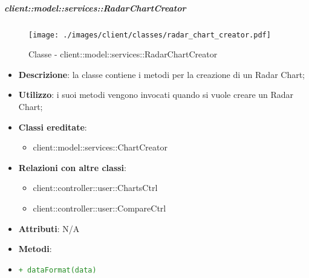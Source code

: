 		\subparagraph{client::model::services::RadarChartCreator} %
		\label{subp:radarchartcreator}
			\begin{figure}[htbp]
				\centering
				\centerline{\texttt{[image: ./images/client/classes/radar\_chart\_creator.pdf]}}
				\caption{Classe - client::model::services::RadarChartCreator}
			\end{figure}
			\begin{itemize}
				\item \textbf{Descrizione}: la classe contiene i metodi per la creazione di un Radar Chart;
				\item \textbf{Utilizzo}: i suoi metodi vengono invocati quando si vuole creare un Radar Chart;
				\item \textbf{Classi ereditate}:
					\begin{itemize}
						\item client::model::services::ChartCreator
					\end{itemize}
				\item \textbf{Relazioni con altre classi}:
					\begin{itemize}
						\item client::controller::user::ChartsCtrl
						\item client::controller::user::CompareCtrl
					\end{itemize}
				\item \textbf{Attributi}: N/A
				\item \textbf{Metodi}: 
					\item \textcolor{forestgreen}{\texttt{+ dataFormat(data)}}
			\end{itemize}

